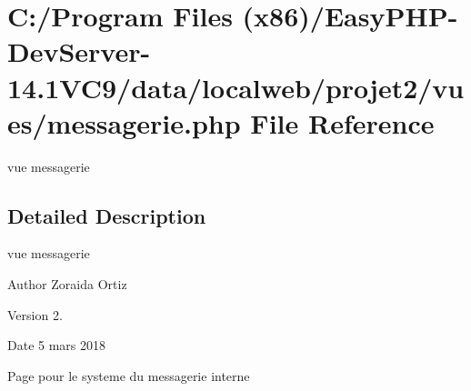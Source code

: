 \hypertarget{messagerie_8php}{}\section{C\+:/\+Program Files (x86)/\+Easy\+P\+H\+P-\/\+Dev\+Server-\/14.1\+V\+C9/data/localweb/projet2/vues/messagerie.php File Reference}
\label{messagerie_8php}


vue messagerie  




\subsection{Detailed Description}
vue messagerie 

\begin{DoxyAuthor}{Author}
Zoraida Ortiz 
\end{DoxyAuthor}
\begin{DoxyVersion}{Version}
2. 
\end{DoxyVersion}
\begin{DoxyDate}{Date}
5 mars 2018
\end{DoxyDate}
Page pour le systeme du messagerie interne 